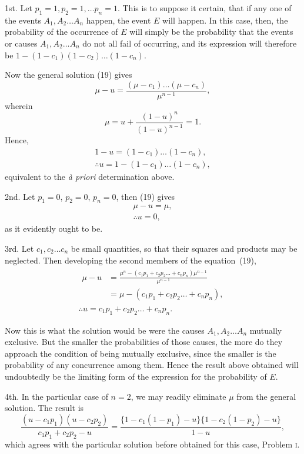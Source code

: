 \documentclass[oneside]{book}
\begin{document}
1st. Let $p_1 = 1, p_2=1, \dotsc p_n = 1$. This is to suppose it
certain, that if any one of the events $A_1, A_2 \dotsc A_n$ happen, the
event $E$ will happen. In this case, then, the probability of the
occurrence of $E$ will simply be the probability that the events or
causes $A_1, A_2 \dotsc A_n$ do not all fail of occurring, and its expression
will therefore be $1-(1-c_1)(1-c_2)\dotsc(1-c_n)$.

Now the general solution (19) gives
\[
  \mu - u = \frac{(\mu-c_1) \dotsc (\mu-c_n)}{\mu^{n-1}},
\]
wherein
\[
  \mu = u + \frac{(1-u)^n}{(1-u)^{n-1}} = 1.
\]
Hence,
\begin{gather*}
  1 - u = (1-c_1) \dotsc (1-c_n),  \\
  \therefore u = 1 - (1-c_1) \dotsc (1-c_n),
\end{gather*}
equivalent to the \textit{\`{a} priori} determination above.

2nd. Let $p_1 = 0$, $p_2 = 0$, $p_n = 0$, then (19) gives
\begin{gather*}
  \mu - u = \mu,   \\
  \therefore u = 0,
\end{gather*}
as it evidently ought to be.

3rd. Let $c_1, c_2\dotsc c_n$ be small quantities, so that their squares
and products may be neglected. Then developing the second
members of the equation~(19),
\begin{gather*}
\begin{split}
  \mu - u
  &= \frac{ \mu^n - (c_1p_1 + c_2p_2 \dotsc + c_np_n)\mu^{n-1} }
          { \mu^{n-1} }   \\
  &= \mu - (c_1p_1 + c_2p_2 \dotsc + c_np_n),
\end{split}   \\
  \therefore u = c_1p_1 + c_2p_2 \dotsc + c_np_n.
\end{gather*}

Now this is what the solution would be were the causes
$A_1, A_2\dotsc A_n$ mutually exclusive. But the smaller the probabilities of those causes, the more do they approach the condition
of being mutually exclusive, since the smaller is the probability of
any concurrence among them. Hence the result above obtained
will undoubtedly be the limiting form of the expression for the
probability of $E$.

4th. In the particular case of $n = 2$, we may readily eliminate
$\mu$ from the general solution. The result is
\[
  \frac{(u-c_1p_1)(u-c_2p_2)}{c_1p_1 + c_2p_2 - u}
  =  \frac{ \{1 - c_1(1-p_1) - u\} \{1 - c_2(1-p_2) - u\} }{1 - u},
\]
which agrees with the particular solution before obtained for this
case, Problem \textsc{i.}
\end{document}
